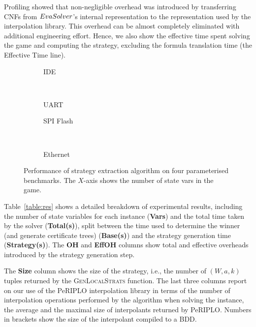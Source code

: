 Profiling showed that non-negligible overhead was introduced by
transferring CNFs from $EvaSolver$'s internal representation to the
representation used by the interpolation library.  This overhead
can be almost completely eliminated with additional engineering
effort.
Hence, we also show the effective time spent solving the game and
computing the strategy, excluding the formula translation time
(the Effective Time line).

\begin{figure}
\centering
\small
\begin{subfigure}{.5\linewidth}
  \centering
  \caption{IDE}
  \label{fig:sub1}
\end{subfigure}%
~
\begin{subfigure}{.5\linewidth}
  \centering
  \caption{UART}
  \label{fig:sub2}
\end{subfigure}
\begin{subfigure}{.5\linewidth}
  \centering
  \caption{SPI Flash}
  \label{fig:sub1}
\end{subfigure}%
~
\begin{subfigure}{.5\linewidth}
  \centering
  \caption{Ethernet}
  \label{fig:sub2}
\end{subfigure}
\vspace{-3mm}
\caption{Performance of strategy extraction algorithm on four parameterised benchmarks.
The $X$-axis shows the number of state vars in the game.}
\vspace{-4mm}
\label{f:graphs}
\end{figure}

Table~\ref{table:res} shows a detailed breakdown of
experimental results, including the number of state variables for
each instance (\textbf{Vars}) and the total time taken by the
solver (\textbf{Total(s)}), split between the time used to 
determine the winner (and generate certificate trees) 
(\textbf{Base(s)}) and the strategy generation time 
(\textbf{Strategy(s)}).  The \textbf{OH} and \textbf{EffOH} 
columns show total and effective overheads introduced by the 
strategy generation step.

The \textbf{Size} column shows the size of the strategy, i.e., the 
number of $(W,a,k)$ tuples returned by the \textsc{GenLocalStrats}
function.  The last three columns report on our use of the PeRIPLO 
interpolation library in terms of the number of interpolation 
operations performed by the algorithm when solving the instance, 
the average and the maximal size of interpolants returned by 
PeRIPLO.  Numbers in brackets show the size of the interpolant 
compiled to a BDD.

